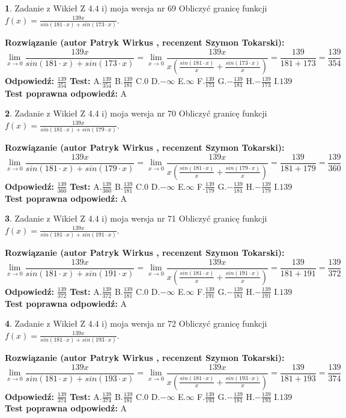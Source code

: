 \documentclass[12pt, a4paper]{article}
\theoremstyle{definition} %
\newtheorem{zad}{}
\newcommand{\zadStart}[1]{\begin{zad}#1\newline}
\newcommand{\zadStop}{\end{zad}}
\newcommand{\rozwStart}[2]{\noindent \textbf{Rozwiązanie (autor #1 , recenzent #2): }\newline}
\newcommand{\rozwStop}{\newline}
\newcommand{\odpStart}{\noindent \textbf{Odpowiedź:}\newline}
\newcommand{\odpStop}{\newline}
\newcommand{\testStart}{\noindent \textbf{Test:}\newline}
\newcommand{\testStop}{\newline}
\newcommand{\kluczStart}{\noindent \textbf{Test poprawna odpowiedź:}\newline}
\newcommand{\kluczStop}{\newline}
\begin{document}
\zadStart{Zadanie z Wikieł Z 4.4 i) moja wersja nr 69}
Obliczyć granicę funkcji $f(x)=\frac{139x}{sin(181\cdot x) +sin(173\cdot x)}$.
\zadStop
\rozwStart{Patryk Wirkus}{Szymon Tokarski}
$$\lim\limits_{x\to 0}\frac{139x}{sin(181\cdot x) +sin(173\cdot x)}=\lim\limits_{x\to 0}\frac{139x}{x(\frac{sin(181\cdot x)}{x}+\frac{sin(173\cdot x)}{x})}=\frac{139}{181+173} = \frac{139}{354}$$
\rozwStop
\odpStart
$\frac{139}{354}$
\odpStop
\testStart
A.$\frac{139}{354}$
B.$\frac{139}{181}$
C.$0$
D.$-\infty$
E.$\infty$
F.$\frac{139}{173}$
G.$-\frac{139}{181}$
H.$-\frac{139}{173}$
I.$139$
\testStop
\kluczStart
A
\kluczStop



\zadStart{Zadanie z Wikieł Z 4.4 i) moja wersja nr 70}
Obliczyć granicę funkcji $f(x)=\frac{139x}{sin(181\cdot x) +sin(179\cdot x)}$.
\zadStop
\rozwStart{Patryk Wirkus}{Szymon Tokarski}
$$\lim\limits_{x\to 0}\frac{139x}{sin(181\cdot x) +sin(179\cdot x)}=\lim\limits_{x\to 0}\frac{139x}{x(\frac{sin(181\cdot x)}{x}+\frac{sin(179\cdot x)}{x})}=\frac{139}{181+179} = \frac{139}{360}$$
\rozwStop
\odpStart
$\frac{139}{360}$
\odpStop
\testStart
A.$\frac{139}{360}$
B.$\frac{139}{181}$
C.$0$
D.$-\infty$
E.$\infty$
F.$\frac{139}{179}$
G.$-\frac{139}{181}$
H.$-\frac{139}{179}$
I.$139$
\testStop
\kluczStart
A
\kluczStop



\zadStart{Zadanie z Wikieł Z 4.4 i) moja wersja nr 71}
Obliczyć granicę funkcji $f(x)=\frac{139x}{sin(181\cdot x) +sin(191\cdot x)}$.
\zadStop
\rozwStart{Patryk Wirkus}{Szymon Tokarski}
$$\lim\limits_{x\to 0}\frac{139x}{sin(181\cdot x) +sin(191\cdot x)}=\lim\limits_{x\to 0}\frac{139x}{x(\frac{sin(181\cdot x)}{x}+\frac{sin(191\cdot x)}{x})}=\frac{139}{181+191} = \frac{139}{372}$$
\rozwStop
\odpStart
$\frac{139}{372}$
\odpStop
\testStart
A.$\frac{139}{372}$
B.$\frac{139}{181}$
C.$0$
D.$-\infty$
E.$\infty$
F.$\frac{139}{191}$
G.$-\frac{139}{181}$
H.$-\frac{139}{191}$
I.$139$
\testStop
\kluczStart
A
\kluczStop



\zadStart{Zadanie z Wikieł Z 4.4 i) moja wersja nr 72}
Obliczyć granicę funkcji $f(x)=\frac{139x}{sin(181\cdot x) +sin(193\cdot x)}$.
\zadStop
\rozwStart{Patryk Wirkus}{Szymon Tokarski}
$$\lim\limits_{x\to 0}\frac{139x}{sin(181\cdot x) +sin(193\cdot x)}=\lim\limits_{x\to 0}\frac{139x}{x(\frac{sin(181\cdot x)}{x}+\frac{sin(193\cdot x)}{x})}=\frac{139}{181+193} = \frac{139}{374}$$
\rozwStop
\odpStart
$\frac{139}{374}$
\odpStop
\testStart
A.$\frac{139}{374}$
B.$\frac{139}{181}$
C.$0$
D.$-\infty$
E.$\infty$
F.$\frac{139}{193}$
G.$-\frac{139}{181}$
H.$-\frac{139}{193}$
I.$139$
\testStop
\kluczStart
A
\kluczStop
\end{document}
